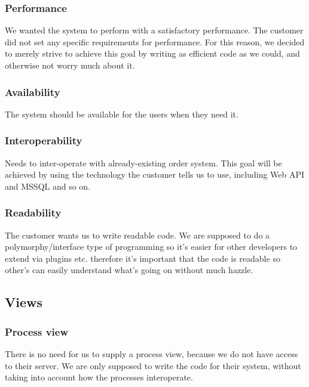 \subsubsection{Performance}
We wanted the system to perform with a satisfactory performance. The customer did not set any specific requirements for performance. For this reason, we decided to merely strive to achieve this goal by writing as efficient code as we could, and otherwise not worry much about it. %
\subsubsection{Availability}
The system should be available for the users when they need it.
\subsubsection{Interoperability}
Needs to inter-operate with already-existing order system. This goal will be achieved by using the technology the customer tells us to use, including Web API and MSSQL and so on.
\subsubsection{Readability}
The customer wants us to write readable code. We are supposed to do a polymorphy/interface type of programming so it's easier for other developers to extend via plugins etc. therefore it's important that the code is readable so other's can easily understand what's going on without much hazzle.

\subsection{Views}


\subsubsection{Process view}
There is no need for us to supply a process view, because we do not have access to their server. We are only supposed to write the code for their system, without taking into account how the processes interoperate.
